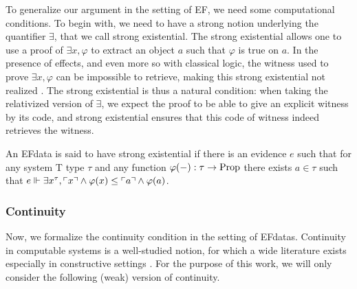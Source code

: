 \documentclass[a4paper,UKenglish,cleveref, autoref, thm-restate]{lipics-v2021}
\begin{document}
To generalize our argument in the setting of EF, we need some computational conditions. To begin with, we need to
have a strong notion underlying the quantifier $\exists$, that we call strong existential. The strong existential allows one to use a proof of $\exists x, \varphi$ to extract an object $a$ such that $\varphi$ is true on $a$. In the presence of effects, and even more so with classical logic,
the witness used to prove $\exists x, \varphi$ can be impossible to retrieve, making
this strong existential not realized \cite{Herbelin05}.
The strong existential is thus a natural condition: when taking the relativized version of $\exists$, we expect the proof to be able to give an explicit witness by its code, and strong existential ensures that this code of witness indeed retrieves the witness.
\begin{definition}
  An EFdata is said to have strong existential if there is an evidence $e$ such that for any system T type $\tau$ and any function $\varphi(-) : \tau \to \mathrm{Prop}$ there exists $a \in \tau$ such that
  $e \Vdash \exists x^\tau, \ulcorner x\urcorner \land \varphi(x) \leq \ulcorner a\urcorner \land \varphi(a)$.
\end{definition}


\subsubsection{Continuity}
Now, we formalize the continuity condition in the setting of EFdatas.
Continuity in computable systems is a well-studied notion, for which a wide literature exists especially
in constructive settings \cite{these_baillon}.
For the purpose of this work, we will only consider the following (weak) version of continuity.
\end{document}
